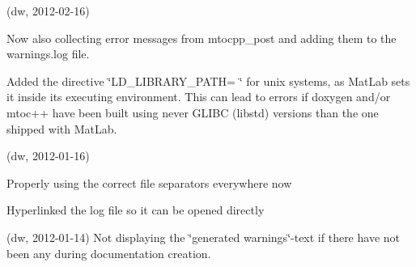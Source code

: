 
\begin{DoxyRefList}
\item[\label{changelog1_3__changelog1_3000001}%
\Hypertarget{changelog1_3__changelog1_3000001}%
Class \hyperlink{class_matlab_doc_maker}{Matlab\+Doc\+Maker} ](dw, 2012-\/02-\/16)
\begin{DoxyItemize}
\item Now also collecting error messages from mtocpp\+\_\+post and adding them to the warnings.\+log file.
\item Added the directive \char`\"{}\+L\+D\+\_\+\+L\+I\+B\+R\+A\+R\+Y\+\_\+\+P\+A\+T\+H= \char`\"{} for unix systems, as Mat\+Lab sets it inside its executing environment. This can lead to errors if doxygen and/or mtoc++ have been built using never G\+L\+I\+BC (libstd) versions than the one shipped with Mat\+Lab.
\end{DoxyItemize}

(dw, 2012-\/01-\/16)
\begin{DoxyItemize}
\item Properly using the correct file separators everywhere now
\item Hyperlinked the log file so it can be opened directly
\end{DoxyItemize}

(dw, 2012-\/01-\/14) Not displaying the \char`\"{}generated warnings\char`\"{}-\/text if there have not been any during documentation creation.
\end{DoxyRefList}